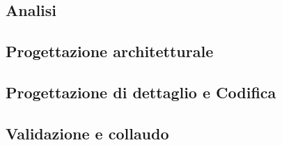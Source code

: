 \documentclass[../piano-di-progetto.tex]{subfiles}
\begin{document}
\subsection{Analisi}%
\label{sub:analisi}

\subsection{Progettazione architetturale}%
\label{sub:progettazione_architetturale}

\subsection{Progettazione di dettaglio e Codifica}%
\label{sub:progettazione_dettaglio_codifica}

\subsection{Validazione e collaudo}%
\label{sub:validazione_collaudo}

\end{document}
